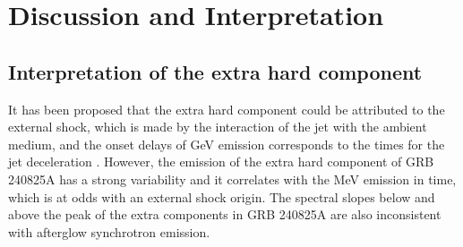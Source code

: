 \documentclass[twocolumn]{aastex631}
\begin{document}
\section{Discussion and Interpretation }
\label{sec:diss}
\subsection{Interpretation of the extra hard component} 

It has been proposed that the extra hard component could be attributed to the external shock, which is made by the interaction of the jet with the
ambient medium, and the onset delays of GeV emission  corresponds to the times
for the jet deceleration \citep{2009MNRAS.400L..75K,2010MNRAS.403..926G}.
However, the   emission of the extra hard component of GRB 240825A  has a strong
variability   and it correlates with the MeV emission in time, which is
at odds with an external shock origin. 
The spectral slopes below and above the peak of the extra components in GRB 240825A are also inconsistent with afterglow synchrotron emission. 
\end{document}
